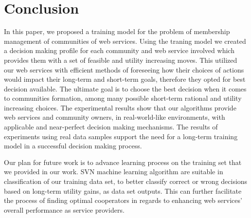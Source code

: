 \documentclass[10pt,journal,cspaper,compsoc]{IEEEtran}
\begin{document}
\section{Conclusion}\label{s:conclusion}

In this paper, we proposed a training model for the problem of membership management of communities of web services. Using the traning model we created a decision making profile for each community and web service involved which provides them with a set of feasible and utility increasing moves. This utilized our web services with efficient methods of foreseeing how their choices of actions would impact their long-term and short-term goals, therefore they opted for best decision available. The ultimate goal is to choose the best decision when it comes to communities formation, among many possible short-term rational and utility increasing choices. The experimental results show that our algorithms provide web services and community owners, in real-world-like environments, with applicable and near-perfect decision making mechanisms. The results of experiments using real data samples support the need for a long-term training model in a successful decision making process.

Our plan for future work is to advance learning process on the training set that we provided in our work. SVN machine learning algorithm are suitable in classification of our training data set, to better classify correct or wrong decisions based on long-term utility gains, as data set outputs. This can further facilitate the process of finding optimal cooperators in regards to enhancing web services' overall performance as service providers.




%
\end{document}
